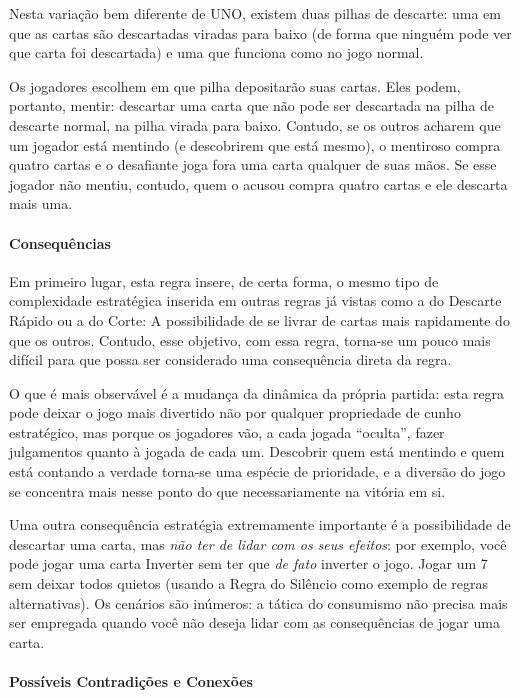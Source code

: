 Nesta variação bem diferente de UNO, existem duas pilhas de descarte: uma em que as cartas são descartadas viradas para baixo (de forma que ninguém pode ver que carta foi descartada) e uma que funciona como no jogo normal.

Os jogadores escolhem em que pilha depositarão suas cartas. Eles podem, portanto, mentir: descartar uma carta que não pode ser descartada na pilha de descarte normal, na pilha virada para baixo. Contudo, se os outros acharem que um jogador está mentindo (e descobrirem que está mesmo), o mentiroso compra quatro cartas e o desafiante joga fora uma carta qualquer de suas mãos. Se esse jogador não mentiu, contudo, quem o acusou compra quatro cartas e ele descarta mais uma.

\paragraph{Consequências}

Em primeiro lugar, esta regra insere, de certa forma, o mesmo tipo de complexidade estratégica inserida em outras regras já vistas como a do Descarte Rápido ou a do Corte: A possibilidade de se livrar de cartas mais rapidamente do que os outros. Contudo, esse objetivo, com essa regra, torna-se um pouco mais difícil para que possa ser considerado uma consequência direta da regra.

O que é mais observável é a mudança da dinâmica da própria partida: esta regra pode deixar o jogo mais divertido não por qualquer propriedade de cunho estratégico, mas porque os jogadores vão, a cada jogada ``oculta'', fazer julgamentos quanto à jogada de cada um. Descobrir quem está mentindo e quem está contando a verdade torna-se uma espécie de prioridade, e a diversão do jogo se concentra mais nesse ponto do que necessariamente na vitória em si.

Uma outra consequência estratégia extremamente importante é a possibilidade de descartar uma carta, mas \emph{não ter de lidar com os seus efeitos}: por exemplo, você pode jogar uma carta Inverter sem ter que \emph{de fato} inverter o jogo. Jogar um 7 sem deixar todos quietos (usando a Regra do Silêncio como exemplo de regras alternativas). Os cenários são inúmeros: a tática do consumismo não precisa mais ser empregada quando você não deseja lidar com as consequências de jogar uma carta.

\paragraph{Possíveis Contradições e Conexões}

